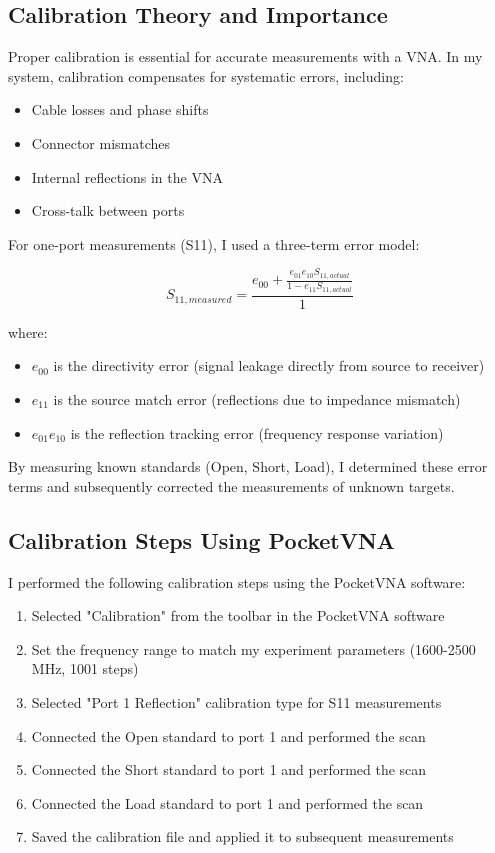 \documentclass[11pt,a4paper]{article}
\begin{document}
\subsection{Calibration Theory and Importance}

Proper calibration is essential for accurate measurements with a VNA. In my system, calibration compensates for systematic errors, including:

\begin{itemize}
    \item Cable losses and phase shifts
    \item Connector mismatches
    \item Internal reflections in the VNA
    \item Cross-talk between ports
\end{itemize}

For one-port measurements (S11), I used a three-term error model:

\begin{equation}
    S_{11,measured} = \frac{e_{00} + \frac{e_{01}e_{10}S_{11,actual}}{1-e_{11}S_{11,actual}}}{1}
\end{equation}

where:
\begin{itemize}
    \item $e_{00}$ is the directivity error (signal leakage directly from source to receiver)
    \item $e_{11}$ is the source match error (reflections due to impedance mismatch)
    \item $e_{01}e_{10}$ is the reflection tracking error (frequency response variation)
\end{itemize}

By measuring known standards (Open, Short, Load), I determined these error terms and subsequently corrected the measurements of unknown targets.

\subsection{Calibration Steps Using PocketVNA}

I performed the following calibration steps using the PocketVNA software:

\begin{enumerate}
    \item Selected "Calibration" from the toolbar in the PocketVNA software
    \item Set the frequency range to match my experiment parameters (1600-2500 MHz, 1001 steps)
    \item Selected "Port 1 Reflection" calibration type for S11 measurements
    \item Connected the Open standard to port 1 and performed the scan
    \item Connected the Short standard to port 1 and performed the scan
    \item Connected the Load standard to port 1 and performed the scan
    \item Saved the calibration file and applied it to subsequent measurements
\end{enumerate}
\end{document}
